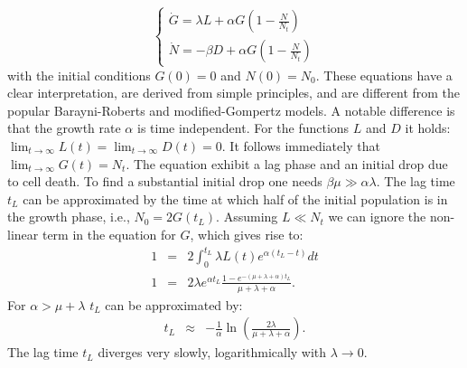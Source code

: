 \documentclass[10pt,A4paper]{article}
\begin{document}
\begin{equation}
    \begin{cases}
        \dot{G} = \lambda L + \alpha G\left(1-\frac{N}{N_t}\right)\\
        \dot{N} = - \beta D + \alpha G\left(1-\frac{N}{N_t}\right)
    \end{cases}
\end{equation}
with the initial conditions $G(0)=0$ and $N(0)=N_0$. 
These equations have a clear interpretation, are derived from simple principles, and are different from the popular Barayni-Roberts and modified-Gompertz models.
A notable difference is that the growth rate $\alpha$ is time independent.
For the functions $L$ and $D$ it holds: $\lim_{t\to\infty} L(t) = \lim_{t\to\infty} D(t) = 0$.
It follows immediately that $\lim_{t\to\infty} G(t) = N_t$.
The equation exhibit a lag phase and an initial drop due to cell death.
To find a substantial initial drop one needs $\beta \mu \gg \alpha \lambda$.
The lag time $t_L$ can be approximated by the time at which half of the initial population is in the growth phase, i.e., $N_0=2G(t_L)$.
Assuming $L\ll N_t$ we can ignore the non-linear term in the equation for $G$, which gives rise to:
\begin{eqnarray}
    1&=& 2\int_0^{t_L} \lambda L(t)e^{\alpha(t_L-t)}dt\\
    1  &=& 2\lambda e^{\alpha t_L}\frac{1-e^{-(\mu+\lambda+\alpha)t_L}}{\mu+\lambda+\alpha}.
\end{eqnarray}
For $\alpha > \mu+\lambda$ $t_L$ can be approximated by:
\begin{eqnarray}
    t_L &\approx& -\frac{1}{\alpha}\ln\left(\frac{2\lambda}{\mu+\lambda+\alpha}\right).
\end{eqnarray}
The lag time $t_L$ diverges very slowly, logarithmically with $\lambda\to 0$.
%
%
%
\end{document}
